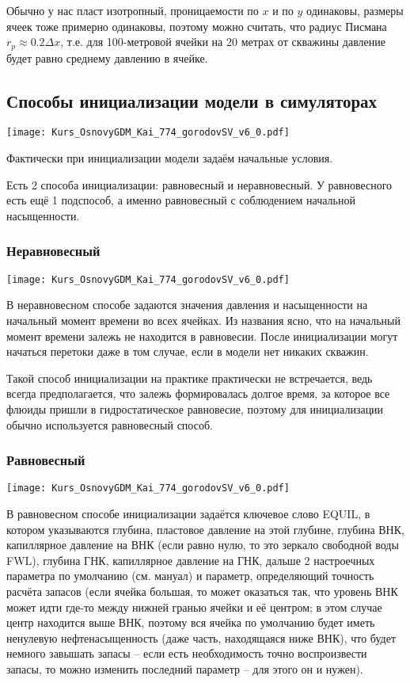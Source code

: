 \documentclass[main.tex]{subfiles}
\begin{document}
Обычно у нас пласт изотропный, проницаемости по $x$ и по $y$ одинаковы, размеры ячеек тоже примерно одинаковы, поэтому можно считать, что радиус Писмана $r_p\approx0.2\Delta x$, т.е. для 100-метровой ячейки на 20 метрах от скважины давление будет равно среднему давлению в ячейке.

\subsection{Способы инициализации модели в симуляторах}

\texttt{[image: Kurs\_OsnovyGDM\_Kai\_774\_gorodovSV\_v6\_0.pdf]}

Фактически при инициализации модели задаём начальные условия.

Есть 2 способа инициализации: равновесный и неравновесный.
У равновесного есть ещё 1 подспособ, а именно равновесный с соблюдением начальной насыщенности.  

\subsubsection{Неравновесный}

\texttt{[image: Kurs\_OsnovyGDM\_Kai\_774\_gorodovSV\_v6\_0.pdf]}

В неравновесном способе задаются значения давления и насыщенности на начальный момент времени во всех ячейках.
Из названия ясно, что на начальный момент времени залежь не находится в равновесии.
После инициализации могут начаться перетоки даже в том случае, если в модели нет никаких скважин.

Такой способ инициализации на практике практически не встречается, ведь всегда предполагается, что залежь формировалась долгое время, за которое все флюиды пришли в гидростатическое равновесие, поэтому для инициализации обычно используется равновесный способ.

\subsubsection{Равновесный}

\texttt{[image: Kurs\_OsnovyGDM\_Kai\_774\_gorodovSV\_v6\_0.pdf]}

В равновесном способе инициализации задаётся ключевое слово EQUIL, в котором указываются глубина, пластовое давление на этой глубине, глубина ВНК, капиллярное давление на ВНК (если равно нулю, то это зеркало свободной воды FWL), глубина ГНК, капиллярное давление на ГНК, дальше 2 настроечных параметра по умолчанию (см. мануал) и параметр, определяющий точность расчёта запасов (если ячейка большая, то может оказаться так, что уровень ВНК может идти где-то между нижней гранью ячейки и её центром; в этом случае центр находится выше ВНК, поэтому вся ячейка по умолчанию будет иметь ненулевую нефтенасыщенность (даже часть, находящаяся ниже ВНК), что будет немного завышать запасы -- если есть необходимость точно воспроизвести запасы, то можно изменить последний параметр -- для этого он и нужен).
\\
\end{document}
